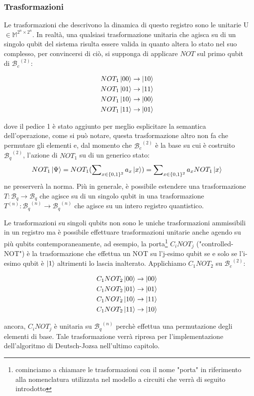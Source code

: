 \documentclass[12pt,a4paper,openright]{report}
\begin{document}
\subsubsection{Trasformazioni}

Le trasformazioni che descrivono la dinamica di questo registro sono le unitarie U $\in \mathbb{M}^{2^n\times2^n}$.
In realtà, una qualsiasi trasformazione unitaria che agisca su di un singolo qubit del sistema risulta essere valida in quanto altera lo stato nel suo complesso,
per convincersi di ciò, si supponga di applicare $NOT$ sul primo qubit di ${\mathcal{B}_c}^{(2)}$:
\begin{center}
    \begin{align*}
        &NOT_1\ket{00} \rightarrow  \ket{10} \\
        &NOT_1\ket{01} \rightarrow  \ket{11} \\
        &NOT_1\ket{10} \rightarrow  \ket{00} \\
        &NOT_1\ket{11} \rightarrow  \ket{01}
    \end{align*}
\end{center}
dove il pedice 1 è stato aggiunto per meglio esplicitare la semantica dell'operazione, come si può notare, questa trasformazione altro non fa che permutare gli elementi
e, dal momento che ${\mathcal{B}_c}^{(2)}$ è la base su cui è costruito ${\mathcal{B}_q}^{(2)}$, l'azione di $NOT_1$ su di un generico stato:
\[
    NOT_1\ket{\Psi} = NOT_1(\sum\nolimits_{x \in \{0,1\}^{2}} a_x \ket{x}) = \sum\nolimits_{x \in \{0,1\}^{2}} a_x NOT_1\ket{x}
\] 
ne preserverà la norma. Più in generale, è possibile estendere una trasformazione $T: \mathcal{B}_q \rightarrow \mathcal{B}_q$ che agisce su di un singolo qubit
in una trasformazione $T^{(n)}: {\mathcal{B}_q}^{(n)} \rightarrow {\mathcal{B}_q}^{(n)}$ che agisce su un intero registro quantistico.\par
Le trasformazioni su singoli qubits non sono le uniche trasformazioni ammissibili in un registro ma è possibile effettuare trasformazioni unitarie anche agendo su più qubits contemporaneamente,
ad esempio, la porta\footnote{cominciamo a chiamare le trasformazioni con il nome "porta" in riferimento alla nomenclatura utilizzata nel modello a circuiti che verrà di seguito introdotto} 
$C_iNOT_j$ ("controlled-NOT") è la trasformazione che effettua un NOT su l'j-esimo qubit se e solo se l'i-esimo qubit è $\ket1$ altrimenti lo lascia inalterato. Applichiamo $C_1NOT_2$ su ${\mathcal{B}_c}^{(2)}$:
\begin{center}
    \begin{align*}
        &C_1NOT_2\ket{00} \rightarrow  \ket{00} \\
        &C_1NOT_2\ket{01} \rightarrow  \ket{01} \\
        &C_1NOT_2\ket{10} \rightarrow  \ket{11} \\
        &C_1NOT_2\ket{11} \rightarrow  \ket{10}
    \end{align*}
\end{center}
ancora, $C_iNOT_j$ è unitaria su ${\mathcal{B}_q}^{(n)}$ perchè effettua una permutazione degli elementi di base. Tale trasformazione verrà ripresa per l'implementazione dell'algoritmo di Deutsch-Jozsa nell'ultimo
capitolo.
\end{document}
